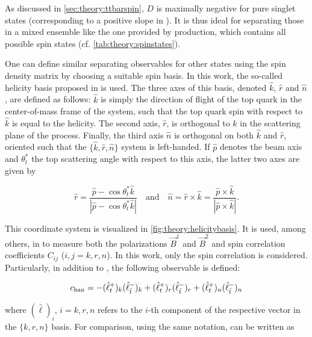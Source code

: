As discussed in \cref{sec:theory:ttbarspin}, $D$ is maximally negative for pure singlet states (corresponding to a positive slope in \chel). It  is thus ideal for separating those in a mixed ensemble like the one provided by \pptt production, which contains all possible spin states (cf. \cref{tab:theory:spinstates}).

One can define similar separating observables for other states using the spin density matrix by choosing a suitable spin basis. In this work, the so-called helicity basis proposed in  is used. The three axes of this basis, denoted $\hat{k}$, $\hat{r}$ and $\hat{n}$, are defined as follows: $\hat{k}$ is simply the direction of flight of the top quark in the center-of-mass frame of the \ttbar system, such that the top quark spin with respect to $\hat{k}$ is equal to the helicity. The second axis, $\hat{r}$, is orthogonal to $\hat{k}$ in the scattering plane of the \pptt process. Finally, the third axis $\hat{n}$ is orthogonal on both $\hat{k}$ and $\hat{r}$, oriented such that the $\{\hat{k},\hat{r},\hat{n}\}$ system is left-handed. If $\hat{p}$ denotes the beam axis and $\theta^*_t$ the top scattering angle with respect to this axis, the latter two axes are given by

\begin{equation}
    \hat{r} = \frac{\hat{p} - \cos \theta^*_t \hat{k}} {| \hat{p} - \cos \theta^*_t \hat{k} |} \quad \mathrm{and} \quad \hat{n} = \hat{r} \times \hat{k} = \frac{\hat{p} \times \hat{k}} {| \hat{p} \times \hat{k} |}.
\end{equation}

This coordinate system is visualized in \cref{fig:theory:helicitybasis}. It is used, among others, in  to measure both the polarizations $\vec{B}^1$ and $\vec{B}^2$ and spin correlation coefficients $C_{ij}$ ($i,j = k,r,n$). In this work, only the spin correlation is considered. Particularly, in addition to \chel, the following observable is defined:

\begin{equation}
    \label{eq:theory:chan}
    c_{\mathrm{han}} = - (\hat{\ell}_t^+)_k (\hat{\ell}_{\bar{t}}^-)_k + (\hat{\ell}_t^+)_r (\hat{\ell}_{\bar{t}}^-)_r + (\hat{\ell}_t^+)_n (\hat{\ell}_{\bar{t}}^-)_n
\end{equation}

\noindent where $(\hat{\ell})_i$, $i=k,r,n$ refers to the $i$-th component of the respective vector in the $\{k,r,n\}$ basis. For comparison, using the same notation, \chel can be written as

